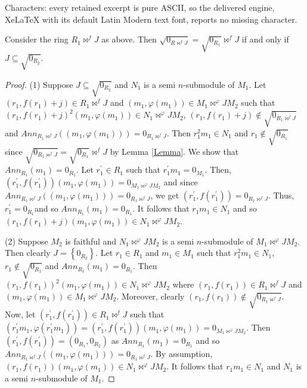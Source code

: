 \documentclass[10pt,a4paper]{amsart}
\begin{document}
Characters: every retained excerpt is pure ASCII, so the delivered engine, XeLaTeX with its default Latin Modern text font, reports no missing character.
\begin{lemma}
\label{Lemma}Consider the ring $R_{1}\Join^{f}J$ as above. Then $\sqrt
{0_{R\Join^{f}J}}=\sqrt{0_{R_{1}}}\Join^{f}J$ if and only if $J\subseteq
\sqrt{0_{R_{2}}}$.
\end{lemma}

\begin{proof}
(1) Suppose $J\subseteq\sqrt{0_{R_{2}}}$ and $N_{1}$ is a semi $n$-submodule
of $M_{1}$. Let $(r_{1},f(r_{1})+j)\in R_{1}\Join^{f}J$ and $(m_{1}%
,\varphi(m_{1}))\in M_{1}\Join^{\varphi}JM_{2}$ such that $(r_{1}%
,f(r_{1})+j)^{2}(m_{1},\varphi(m_{1}))\in N_{1}\Join^{\varphi}JM_{2}$,
$(r_{1},f(r_{1})+j)\notin\sqrt{0_{R_{1}\Join^{f}J}}$ and $Ann_{R_{1}\Join
^{f}J}((m_{1},\varphi(m_{1})))=0_{R_{1}\Join^{f}J}$. Then $r_{1}^{2}m_{1}\in
N_{1}$ and $r_{1}\notin\sqrt{0_{R_{1}}}$ since $\sqrt{0_{R_{1}\Join^{f}J}%
}=\sqrt{0_{R_{1}}}\Join^{f}J$ by Lemma \ref{Lemma}. We show that $Ann_{R_{1}%
}(m_{1})=0_{R_{1}}$. Let $r_{1}^{\prime}\in R_{1}$ such that $r_{1}^{\prime
}m_{1}=0_{M_{1}}.$ Then, $(r_{1}^{\prime},f(r_{1}^{\prime}))(m_{1}%
,\varphi(m_{1}))=0_{M_{1}\Join^{\varphi}JM_{2}}$ and since $Ann_{R_{1}%
\Join^{f}J}((m_{1},\varphi(m_{1})))=0_{R_{1}\Join^{f}J}$, we get
$(r_{1}^{\prime},f(r_{1}^{\prime}))=0_{R_{1}\Join^{f}J}$. Thus, $r_{1}%
^{\prime}=0_{R_{1}}$and so $Ann_{R_{1}}(m_{1})=0_{R_{1}}$. It follows that
$r_{1}m_{1}\in N_{1}$ and so $(r_{1},f(r_{1})+j)(m_{1},\varphi(m_{1}))\in
N_{1}\Join^{\varphi}JM_{2}$.

(2) Suppose $M_{2}$ is faithful and $N_{1}\Join^{\varphi}JM_{2}$ is a semi
$n$-submodule of $M_{1}\Join^{\varphi}JM_{2}$. Then clearly $J=\left\{
0_{R_{2}}\right\}  $. Let $r_{1}\in R_{1}$ and $m_{1}\in M_{1}$ such that
$r_{1}^{2}m_{1}\in N_{1}$, $r_{1}\notin\sqrt{0_{R_{1}}}$ and $Ann_{R_{1}%
}(m_{1})=0_{R_{1}}$. Then $(r_{1},f(r_{1}))^{2}(m_{1},\varphi(m_{1}))\in
N_{1}\Join^{\varphi}JM_{2}$ where $(r_{1},f(r_{1}))\in R_{1}\Join^{f}J$ and
$(m_{1},\varphi(m_{1}))\in M_{1}\Join^{\varphi}JM_{2}$. Moreover, clearly
$(r_{1},f(r_{1}))\notin\sqrt{0_{R_{1}\Join^{f}J}}$. Now, let $(r_{1}^{\prime
},f(r_{1}^{\prime}))\in R_{1}\Join^{f}J$ such that $(r_{1}^{\prime}%
m_{1},\varphi(r_{1}^{\prime}m_{1}))=(r_{1}^{\prime},f(r_{1}^{\prime}%
))(m_{1},\varphi(m_{1}))=0_{M_{1}\Join^{\varphi}JM_{2}}$. Then $(r_{1}%
^{\prime},f(r_{1}^{\prime}))=(0_{R_{1}},0_{R_{2}})$ as $Ann_{R_{1}}%
(m_{1})=0_{R_{1}}$ and so $Ann_{R_{1}\Join^{f}J}((m_{1},\varphi(m_{1}%
)))=0_{R_{1}\Join^{f}J}$. By assumption, $(r_{1},f(r_{1}))(m_{1},\varphi
(m_{1}))\in N_{1}\Join^{\varphi}JM_{2}$. It follows that $r_{1}m_{1}\in N_{1}$
and $N_{1}$ is a semi $n$-submodule of $M_{1}$.
\end{proof}
\end{document}

